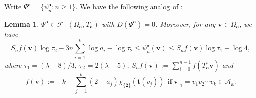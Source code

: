 \documentclass[reqno,11pt,graphicx,]{amsart}
\numberwithin{equation}{section}
\theoremstyle{plain}
\newcommand{\3}{\mathbf{3}}
\newcommand{\ma}{\mathbf{a}}
\newcommand{\mv}{\mathbf{v}}
\newtheorem{lemma}[theorem]{Lemma}
\begin{document}
	Write $\Psi^{\ma}=\{\psi_n^{\ma}:n\geq1\}$. We have the following analog of \cite[Lemma 7]{Qu2016}:
	\begin{lemma}\label{Psi-add} 
		$\Psi^{\ma}\in\mathcal{F}^-(\Omega _{\mathbf{a}},T_{\ma})$ with $D(\Psi^{\ma})=0$. Moreover, for any $\mathbf{v}\in\Omega _{\mathbf{a}} $, we have %
		\begin{equation}
			S_nf(\mv)\log\tau _{2}-3n\sum_{i=1}^{k}\log
			a_{i}-\log \tau _{2}\leq \psi^{\ma}_{n}(\mv)\leq 
			S_nf(\mv)\log\tau_{1}+\log 4,  \label{lem31}
		\end{equation}%
		where $\tau_{1}=(\lambda -8)/3,\ \tau
		_{2}=2(\lambda +5)$, $S_nf(\mv):=\sum_{i=0}^{n-1}f(T_{\ma}^{i}\mv)$ and 
		\begin{equation}\label{ff}
			f(\mv):=-k+\sum\limits_{j=1}^{k}(2-a_{j})\chi _{\{\mathbf{2}\}}(%
			\mathbf{t}(v_{j})) \ \ \text{if}\ \mv |_{1}=v_{1}v_{2}\cdots v_{k}\in\mathscr{A}_{\ma}.
		\end{equation}
	\end{lemma}
	
\end{document}
